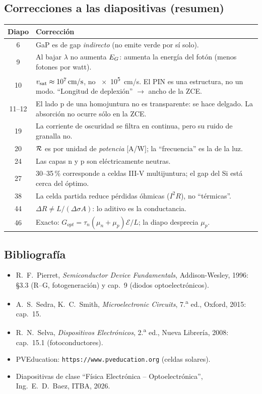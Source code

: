 \subsection{Correcciones a las diapositivas (resumen)}

\begin{table}[H]
\centering\small
\begin{tabularx}{\textwidth}{cX}
\toprule
Diapo & Corrección \\
\midrule
6  & GaP es de gap \emph{indirecto} (no emite verde por sí solo). \\
9  & Al bajar $\lambda$ no aumenta $E_G$: aumenta la energía del fotón (menos fotones por watt). \\
10 & $v_{\mathrm{sat}}\approx\SI{e7}{cm/s}$, no \SI{e5}{cm/s}. El PIN es una estructura, no un modo. ``Longitud de deplexión'' $\to$ ancho de la ZCE. \\
11--12 & El lado p de una homojuntura no es transparente: se hace delgado. La absorción no ocurre sólo en la ZCE. \\
19 & La corriente de oscuridad se filtra en continua, pero su ruido de granalla no. \\
20 & $\mathcal{R}$ es por unidad de \emph{potencia} [\si{A/W}]; la ``frecuencia'' es la de la luz. \\
24 & Las capas n y p son eléctricamente neutras. \\
27 & 30--35\,\% corresponde a celdas III-V multijuntura; el gap del Si está cerca del óptimo. \\
38 & La celda partida reduce pérdidas óhmicas ($I^2R$), no ``térmicas''. \\
44 & $\Delta R\neq L/(\Delta\sigma A)$: lo aditivo es la conductancia. \\
46 & Exacto: $G_{opt}=\tau_n(\mu_n+\mu_p)\mathcal{E}/L$; la diapo desprecia $\mu_p$. \\
\bottomrule
\end{tabularx}
\end{table}

\subsection*{Bibliografía}
\begin{itemize}[nosep]
  \item R.~F.~Pierret, \emph{Semiconductor Device Fundamentals}, Addison-Wesley, 1996:
  §3.3 (R--G, fotogeneración) y cap.~9 (diodos optoelectrónicos).
  \item A.~S.~Sedra, K.~C.~Smith, \emph{Microelectronic Circuits}, 7.\textsuperscript{a} ed.,
  Oxford, 2015: cap.~15.
  \item R.~N.~Selva, \emph{Dispositivos Electrónicos}, 2.\textsuperscript{a} ed., Nueva
  Librería, 2008: cap.~15.1 (fotoconductores).
  \item PVEducation: \texttt{https://www.pveducation.org} (celdas solares).
  \item Diapositivas de clase ``Física Electrónica -- Optoelectrónica'', Ing.~E.~D.~Baez, ITBA, 2026.
\end{itemize}
